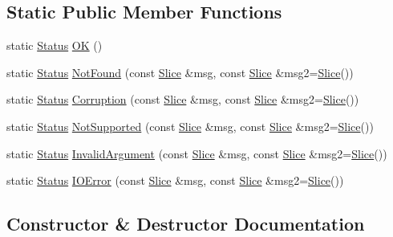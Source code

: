 \subsection*{Static Public Member Functions}
\begin{DoxyCompactItemize}
\item 
static \mbox{\hyperlink{classleveldb_1_1_status}{Status}} \mbox{\hyperlink{classleveldb_1_1_status_a8e3720d233281c874a53c17e081f51b3}{OK}} ()
\item 
static \mbox{\hyperlink{classleveldb_1_1_status}{Status}} \mbox{\hyperlink{classleveldb_1_1_status_a9e5beb5b2e758f041e0c012426e7b1b8}{Not\+Found}} (const \mbox{\hyperlink{classleveldb_1_1_slice}{Slice}} \&msg, const \mbox{\hyperlink{classleveldb_1_1_slice}{Slice}} \&msg2=\mbox{\hyperlink{classleveldb_1_1_slice}{Slice}}())
\item 
static \mbox{\hyperlink{classleveldb_1_1_status}{Status}} \mbox{\hyperlink{classleveldb_1_1_status_a755b1ee5b0029cf9ea1128f1cdff5855}{Corruption}} (const \mbox{\hyperlink{classleveldb_1_1_slice}{Slice}} \&msg, const \mbox{\hyperlink{classleveldb_1_1_slice}{Slice}} \&msg2=\mbox{\hyperlink{classleveldb_1_1_slice}{Slice}}())
\item 
static \mbox{\hyperlink{classleveldb_1_1_status}{Status}} \mbox{\hyperlink{classleveldb_1_1_status_a66c6b7171cedb55651e34e5df9a14705}{Not\+Supported}} (const \mbox{\hyperlink{classleveldb_1_1_slice}{Slice}} \&msg, const \mbox{\hyperlink{classleveldb_1_1_slice}{Slice}} \&msg2=\mbox{\hyperlink{classleveldb_1_1_slice}{Slice}}())
\item 
static \mbox{\hyperlink{classleveldb_1_1_status}{Status}} \mbox{\hyperlink{classleveldb_1_1_status_aefef9f88d0a6ca6d34bd9dec1670309e}{Invalid\+Argument}} (const \mbox{\hyperlink{classleveldb_1_1_slice}{Slice}} \&msg, const \mbox{\hyperlink{classleveldb_1_1_slice}{Slice}} \&msg2=\mbox{\hyperlink{classleveldb_1_1_slice}{Slice}}())
\item 
static \mbox{\hyperlink{classleveldb_1_1_status}{Status}} \mbox{\hyperlink{classleveldb_1_1_status_ada6143081d41803808f77287153f96b7}{I\+O\+Error}} (const \mbox{\hyperlink{classleveldb_1_1_slice}{Slice}} \&msg, const \mbox{\hyperlink{classleveldb_1_1_slice}{Slice}} \&msg2=\mbox{\hyperlink{classleveldb_1_1_slice}{Slice}}())
\end{DoxyCompactItemize}


\subsection{Constructor \& Destructor Documentation}
\mbox{\label{classleveldb_1_1_status_a01e02f5736b96f1b1e58bbcb0c98bf92}} 
